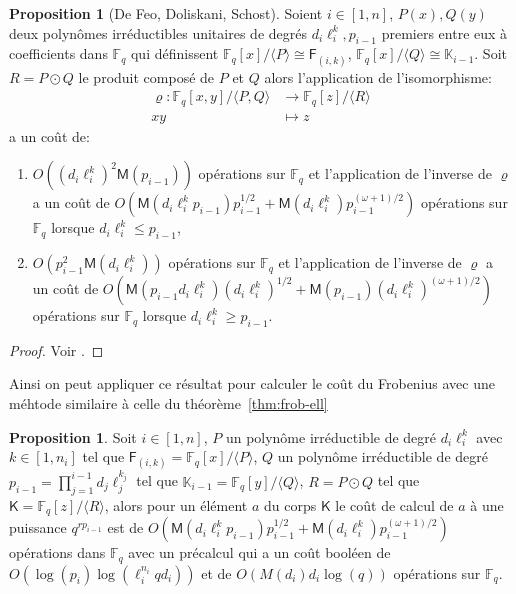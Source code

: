 \documentclass[10pt,a4paper]{book}
\theoremstyle{plain}
\theoremstyle{definition}
\theoremstyle{definition}
\theoremstyle{definition}
\newtheorem{prop}[thm]{Proposition}
\theoremstyle{definition}
\theoremstyle{remark}
\theoremstyle{remark}
\theoremstyle{definition}
\begin{document}
\begin{prop}[De Feo, Doliskani, Schost]
\label{pro:iso:fie}
Soient $i \in [1,n]$, $P(x),Q(y)$ deux polynômes irréductibles unitaires de degrés 
$d_i\ell_i^{k},p_{i-1}$ premiers entre eux à coefficients dans $\mathbb{F}_q$
qui définissent $\mathbb{F}_q[x]/\langle P \rangle \cong \mathsf{F}_{(i,k)}$,
$\mathbb{F}_q[x]/\langle Q \rangle \cong \mathbb{K}_{i-1}$. Soit $R=P \odot 
Q$ le produit composé de $P$ et $Q$ alors l'application de l'isomorphisme:
\begin{equation*}
\begin{alignedat}{1}
\varrho : \mathbb{F}_q[x,y]/\langle P, Q \rangle & \rightarrow \mathbb{F}_q[z]/\langle R \rangle \\
xy & \mapsto z
\end{alignedat}
\end{equation*}
a un coût de:
\begin{enumerate}
\item $O((d_i\ell_i^{k})^2\mathsf{M}(p_{i-1}))$ opérations sur $\mathbb{F}_q$
 et l'application de l'inverse de $\varrho$ a un coût de 
 $O(\mathsf{M}(d_i\ell_i^{k}p_{i-1})p_{i-1}^{1/2}+\mathsf{M}(d_i\ell_i^{k})p_{i-1}^{(\omega+1)/2})$ 
opérations sur $\mathbb{F}_q$ lorsque 
$d_i\ell_i^{k} \leqslant p_{i-1}$,
\item $O(p_{i-1}^2\mathsf{M}(d_i\ell_i^{k}))$ opérations sur $\mathbb{F}_q$ 
et l'application de l'inverse de $\varrho$ a un coût de 
$O(\mathsf{M}(p_{i-1}d_i\ell_i^{k})(d_i\ell_i^{k})^{1/2}+\mathsf{M}(p_{i-1})(d_i\ell_i^{k})^{(\omega+1)/2})$ 
opérations sur $\mathbb{F}_q$ lorsque $d_i\ell_i^{k} \geqslant p_{i-1}$.
\end{enumerate}
\end{prop}

\begin{proof}
Voir \cite{DeFeoDoliskaniSchost14}.
\end{proof}

Ainsi on peut appliquer ce résultat pour calculer le coût du Frobenius avec 
une méhtode similaire à celle du théorème~\ref{thm:frob-ell}
\begin{prop}
\label{pro:fro:com}
Soit $i \in [1,n]$, $P$ un polynôme irréductible de degré $d_i\ell_i^{k}$ avec 
$k \in [1,n_i]$ tel que $\mathsf{F}_{(i,k)}=\mathbb{F}_q[x]/\langle P \rangle$,
$Q$ un polynôme irréductible de degré $p_{i-1}=\prod_{j=1}^{i-1}d_j\ell_j^{k_j}$
tel que $\mathbb{K}_{i-1}=\mathbb{F}_q[y]/\langle Q \rangle$, $R=P \odot Q$ 
tel que  $\mathsf{K}=\mathbb{F}_q[z]/\langle R\rangle$, alors pour un 
élément $a$ du corps $\mathsf{K}$ le coût de calcul de $a$ à une puissance 
$q^{r p_{i-1}}$ est de 
$O(\mathsf{M}(d_i\ell_i^{k}p_{i-1})p_{i-1}^{1/2}+\mathsf{M}(d_i\ell_i^{k})p_{i-1}^{(\omega+1)/2})$ 
opérations dans $\mathbb{F}_q$ avec un 
précalcul qui a un coût booléen de $O(\log(p_{i})\log(\ell_i^{n_i}qd_i))$ et  
de $O( M(d_i) d_i\log(q))$ opérations sur $\mathbb{F}_q$.
\end{prop}
\end{document}
